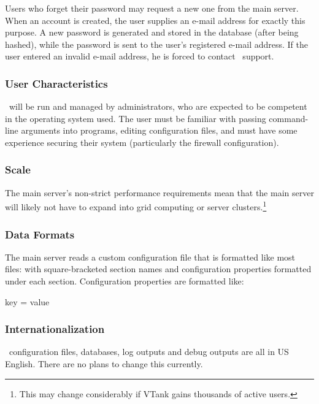 Users who forget their password may request a new one from the main server. When an account is created, the user supplies an e-mail address for exactly this purpose. A new password is generated and stored in the database (after being hashed), while the password is sent to the user's registered e-mail address. If the user entered an invalid e-mail address, he is forced to contact \VTank\ support.

\subsubsection*{User Characteristics}

\MainServer\ will be run and managed by administrators, who are expected to be competent in the operating system used. The user must be familiar with passing command-line arguments into programs, editing configuration files, and must have some experience securing their system (particularly the firewall configuration).

\subsubsection*{Scale}

The main server's non-strict performance requirements mean that the main server will likely not have to expand into grid computing or server clusters.\footnote{This may change considerably if VTank gains thousands of active users.}

\subsubsection*{Data Formats}

The main server reads a custom configuration file that is formatted like most  files: with square-bracketed section names and configuration properties formatted under each section. Configuration properties are formatted like:

\begin{commands}
key = value
\end{commands}

\subsubsection*{Internationalization}

\MainServer\ configuration files, databases, log outputs and debug outputs are all in US English. There are no plans to change this currently.

